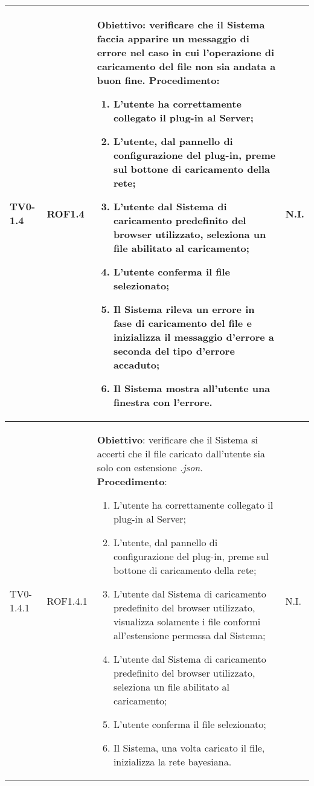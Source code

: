 \begin{longtable}{|C{.15\textwidth}|C{.13\textwidth}|m{.65\textwidth}|C{.08\textwidth}|}
TV0-1.4 & ROF1.4 &
	\textbf{Obiettivo}: verificare che il Sistema faccia apparire un messaggio di errore nel caso in cui l'operazione di caricamento del file non sia andata a buon fine. \newline
	\textbf{Procedimento}:
	\begin{enumerate}
		\item L'utente ha correttamente collegato il plug-in al Server;
		\item L'utente, dal pannello di configurazione del plug-in, preme sul bottone di caricamento della rete;
		\item L'utente dal Sistema di caricamento predefinito del browser utilizzato, seleziona un file abilitato al caricamento;
		\item L'utente conferma il file selezionato;
		\item Il Sistema rileva un errore in fase di caricamento del file e inizializza il messaggio d'errore a seconda del tipo d'errore accaduto;
		\item Il Sistema mostra all'utente una finestra con l'errore.
	\end{enumerate}
	& N.I. \\
\hline

 TV0-1.4.1 & ROF1.4.1 &
	\textbf{Obiettivo}: verificare che il Sistema si accerti che il file caricato dall'utente sia solo con estensione \textit{.json}. \newline
	\textbf{Procedimento}:
	\begin{enumerate}
		\item L'utente ha correttamente collegato il plug-in al Server;
		\item L'utente, dal pannello di configurazione del plug-in, preme sul bottone di caricamento della rete;
		\item L'utente dal Sistema di caricamento predefinito del browser utilizzato, visualizza solamente i file conformi all'estensione permessa dal Sistema;
		\item L'utente dal Sistema di caricamento predefinito del browser utilizzato, seleziona un file abilitato al caricamento;
		\item L'utente conferma il file selezionato;
		\item Il Sistema, una volta caricato il file, inizializza la rete bayesiana.
	\end{enumerate}
	& N.I. \\
\hline


\end{longtable}
